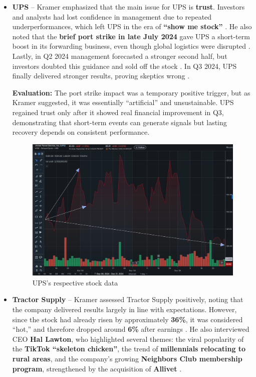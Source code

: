 \documentclass[12pt,a4paper]{article}
\begin{document}
\begin{itemize}
    \item \textbf{UPS} -- Kramer emphasized that the main issue for UPS is \textbf{trust}. 
    Investors and analysts had lost confidence in management due to repeated underperformances, which left UPS in the era of \textbf{“show me stock”} \cite{cnbc}. 
    He also noted that the \textbf{brief port strike in late July 2024} gave UPS a short-term boost in its forwarding business, 
    even though global logistics were disrupted \cite{reutersUPS}. 
    Lastly, in Q2 2024 management forecasted a stronger second half, but investors doubted this guidance and sold off the stock \cite{UPS}. 
    In Q3 2024, UPS finally delivered stronger results, proving skeptics wrong \cite{UPS}. 
\vspace{0.3cm}

    \textbf{Evaluation:} The port strike impact was a temporary positive trigger, but as Kramer suggested, 
    it was essentially “artificial” and unsustainable. 
    UPS regained trust only after it showed real financial improvement in Q3, 
    demonstrating that short-term events can generate signals but lasting recovery depends on consistent performance.
\vspace{1.5cm}

\begin{figure}[H]
    \centering
    \includegraphics[width=0.85\linewidth]{upsd.jpeg}
    \caption{UPS's respective stock data\cite{UPS}}
    \label{fig:ups}
\end{figure}
\FloatBarrier
\vspace{1.1cm}

    \item \textbf{Tractor Supply} -- Kramer assessed Tractor Supply positively, 
    noting that the company delivered results largely in line with expectations. 
    However, since the stock had already risen by approximately \textbf{36\%}, 
    it was considered “hot,” and therefore dropped around \textbf{6\%} after earnings \cite{cnbc}. 
    He also interviewed CEO \textbf{Hal Lawton}, 
    who highlighted several themes: the viral popularity of the \textbf{TikTok “skeleton chicken”}, 
    the trend of \textbf{millennials relocating to rural areas}, 
    and the company’s growing \textbf{Neighbors Club membership program}, 
    strengthened by the acquisition of \textbf{Allivet} \cite{AllivetPR}.
\vspace{0.8cm}


\end{itemize}
\end{document}
